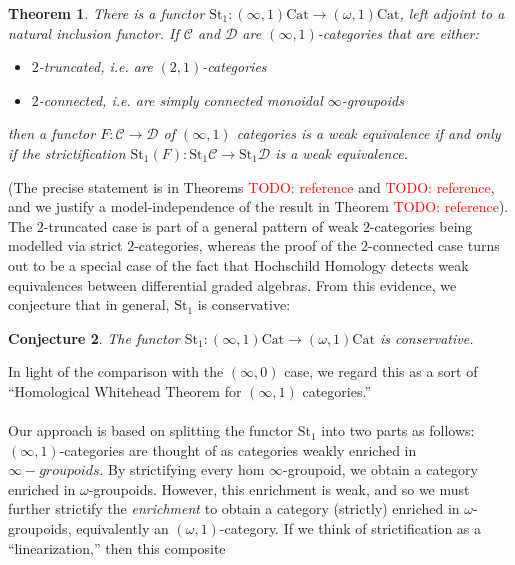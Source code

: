 \documentclass[12pt]{article}
\newtheorem{theorem}{Theorem}[section]
\newtheorem{conjecture}[theorem]{Conjecture}
\theoremstyle{definition}
\newcommand{\TODO}[1]{\textcolor{red}{TODO: {#1}}}
\newcommand{\C}{\mathcal{C}}
\newcommand{\D}{\mathcal{D}}
\newcommand{\stinfty}{\omega\text{Gpd}}
\newcommand{\st}{\text{St}}
\begin{document}
	\begin{theorem}
		There is a functor $\st_1: (\infty,1)\text{Cat} \to (\omega,1)\text{Cat}$, left adjoint to a natural inclusion functor. If $\C$ and $\D$ are $(\infty,1)$-categories that are either:
		\begin{itemize}
			\item $2$-truncated, i.e. are $(2,1)$-categories
			\item $2$-connected, i.e. are simply connected monoidal $\infty$-groupoids
		\end{itemize}		 
then a functor $F: \C \to \D$ of $(\infty,1)$ categories is a weak equivalence if and only if the strictification $\st_1(F): \st_1\C \to \st_1\D$ is a weak equivalence.
	\end{theorem} 
	(The precise statement is in Theorems \TODO{reference} and \TODO{reference}, and we justify a model-independence of the result in Theorem \TODO{reference}). The $2$-truncated case is part of a general pattern of weak $2$-categories being modelled via strict $2$-categories, whereas the proof of the $2$-connected case turns out to be a special case of the fact that Hochschild Homology detects weak equivalences between differential graded algebras.
	From this evidence, we conjecture that in general, $\st_1$ is conservative:
	\begin{conjecture}\label{conjecture:conservativity}
		The functor $\st_1: (\infty,1)\text{Cat} \to (\omega,1)\text{Cat}$ is conservative. 
	\end{conjecture}
	In light of the comparison with the $(\infty, 0)$ case, we regard this as a sort of ``Homological Whitehead Theorem for $(\infty,1)$ categories.''
	\\\\
	Our approach is based on splitting the functor $\st_1$ into two parts as follows: 
	$(\infty,1)$-categories are thought of as categories weakly enriched in $\infty-groupoids$.
	By strictifying every hom $\infty$-groupoid, we obtain a category enriched in $\omega$-groupoids. 
	However, this enrichment is weak, and so we must further strictify the \textit{enrichment} to obtain a category (strictly) enriched in $\omega$-groupoids, equivalently an $(\omega,1)$-category.
	If we think of strictification as a ``linearization,'' then this composite
	\begin{center}
	\end{center}
\end{document}
